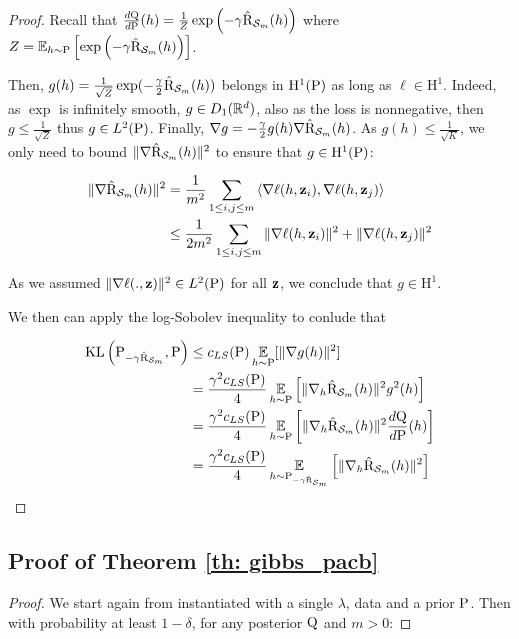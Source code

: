 \begin{noaddcontents}
\begin{proof}
      Recall that $\frac{d\Q}{d\P}(h) = \frac{1}{Z}\exp\LP -\gamma \hat{\Risk}_{\S_m}(h)\RP $ where $Z= \EE_{h\sim \P}\LB \exp\LP -\gamma \hat{\Risk}_{\S_m}(h)\RP \RB$.
      
      Then, $g(h) = \frac{1}{\sqrt{Z}}\exp(-\frac{\gamma}{2} \hat{\Risk}_{\S_m}(h)) $ belongs in $\mathrm{H}^{1}(\P)$ as long as $\ell \in \mathrm{H}^{1}$. Indeed, as $\exp$ is infinitely smooth, $g\in D_1(\Rbb^d)$, also as the loss is nonnegative, then $g \leq \frac{1}{\sqrt{Z}}$ thus $g\in L^2(\P)$. Finally, $\nabla g = -\frac{\gamma }{2}g(h)\nabla \hat{\Risk}_{\S_m}(h) $. As $g(h)\leq \frac{1}{\sqrt{K}}$, we only need to bound $ \|\nabla \hat{\Risk}_{\S_m}(h)\|^2$ to ensure that $g\in \mathrm{H}^{1}(\P)$:
    
      \begin{align*}
        \|\nabla \hat{\Risk}_{\S_m}(h)\|^2 & =\frac{1}{m^2}\sum_{1\leq i,j\leq m}\LA \nabla\ell(h,\z_i), \nabla \ell(h,\z_j) \RA \\
        & \leq \frac{1}{2m^2}\sum_{1\leq i,j\leq m} \|\nabla\ell(h,\z_i)\|^2 + \|\nabla\ell(h,\z_j)\|^2 
      \end{align*}
    
      As we assumed $\|\nabla\ell(.,\z)\|^2\in L^2(\P)$ for all $\z$, we conclude that $g\in \mathrm{H}^{1}$.
    
      We then can apply the log-Sobolev inequality to conlude that
    
      \begin{align*}
        \KL\LP \P_{-\gamma \hat{\Risk}_{\S_m}},\P\RP  & \leq c_{LS}(\P) \EE_{h\sim\P}[\|\nabla g(h)\|^2] \\
        & = \frac{\gamma^2 c_{LS}(\P)}{4}\EE_{h\sim\P} \LB \|\nabla_h \hat{\Risk}_{\S_m}(h) \|^2 g^2(h) \RB \\
        &= \frac{\gamma^2 c_{LS}(\P)}{4}\EE_{h\sim\P} \LB \|\nabla_h \hat{\Risk}_{\S_m}(h) \|^2 \frac{d\Q}{d\P}(h) \RB\\
        & =\frac{\gamma^2 c_{LS}(\P)}{4} \EE_{h\sim \P_{-\gamma \hat{\Risk}_{\S_m}}}\LB \|\nabla_h \hat{\Risk}_{\S_m}(h) \|^2 \RB
      \end{align*}
    \end{proof}
      \subsection{Proof of Theorem \ref{th: gibbs_pacb}}
        \label{sec:proof_gibbs_pacb}
      \begin{proof}
      We start again from  \citet[Corollary 17]{chugg2023unified} instantiated with a single $\lambda$, \iid data and a prior $\P$. Then with probability at least $1-\delta$, for any posterior $\Q$ and $m>0$:
    

\end{proof}
\end{noaddcontents}
